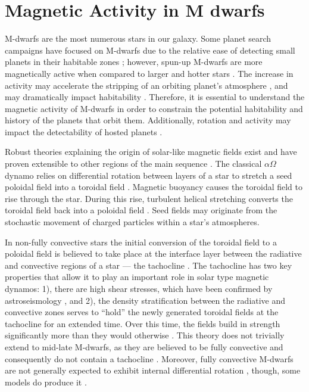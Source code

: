 \section{Magnetic Activity in M dwarfs} \label{sec:magActivity-intro}
M-dwarfs are the most numerous stars in our galaxy. Some planet search
campaigns have focused on M-dwarfs due to the relative ease of detecting small
planets in their habitable zones \citep[e.g.][]{Nut08}; however, spun-up M-dwarfs are
more magnetically active when compared to larger and hotter stars \citep{Haw91,
Del98, Sch14}. The increase in activity may accelerate the stripping of an
orbiting planet's atmosphere \citep[e.g.][]{Owe16}, and may dramatically impact
habitability \citep{Shi16}. Therefore, it is essential to understand the
magnetic activity of M-dwarfs in order to constrain the potential habitability
and history of the planets that orbit them. Additionally, rotation and activity
may impact the detectability of hosted planets \citep[e.g.][]{Rob14,
Newton2016, Van16}.

Robust theories explaining the origin of solar-like magnetic fields exist and
have proven extensible to other regions of the main sequence \citep{Cha14}. The
classical $\alpha\Omega$ dynamo relies on differential rotation between layers
of a star to stretch a seed poloidal field into a toroidal field \citep{Par55,
Cam17}. Magnetic buoyancy causes the toroidal field to rise through the star.
During this rise, turbulent helical stretching converts the toroidal field back
into a poloidal field \citep{Par55}. Seed fields may originate from the
stochastic movement of charged particles within a star's atmospheres.

In non-fully convective stars the initial conversion of the toroidal field to a
poloidal field is believed to take place at the interface layer between the
radiative and convective regions of a star --- the tachocline \citep{Noy84,
Tom96, Dik99}. The tachocline has two key properties that allow it to play an
important role in solar type magnetic dynamos: 1), there are high shear
stresses, which have been confirmed by astroseismology \citep{Tho96}, and 2),
the density stratification between the radiative and convective zones serves to
``hold'' the newly generated toroidal fields at the tachocline for an extended
time. Over this time, the fields build in strength significantly more than they
would otherwise \citep{Par75}. This theory does not trivially extend to
mid-late M-dwarfs, as they are believed to be fully convective and consequently
do not contain a tachocline \citep{Cha97}. Moreover, fully convective M-dwarfs
are not generally expected to exhibit internal differential rotation
\citep[e.g.][]{barnes2004differential, barnes2005dependence}, though, some
models do produce it \citep{Yad13}.

